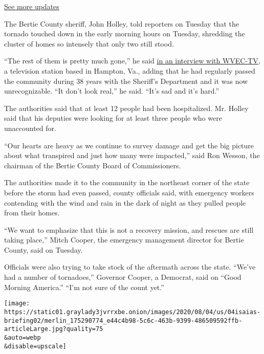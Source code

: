 \href{https://www.nytimes3xbfgragh.onion/2020/08/04/us/isaias-storm-updates.html?action=click\&pgtype=Article\&state=default\&region=MAIN_CONTENT_1\&context=storylines_live_updates}{See
more updates}

The Bertie County sheriff, John Holley, told reporters on Tuesday that
the tornado touched down in the early morning hours on Tuesday,
shredding the cluster of homes so intensely that only two still stood.

``The rest of them is pretty much gone,'' he said
\href{https://www.13newsnow.com/video/news/local/north-carolina/bertie-county-sheriff-john-holley-talks-about-fatality-in-north-carolina/291-99306d30-d640-4e9a-97fa-0221d565f5df}{in
an interview with WVEC-TV}, a television station based in Hampton, Va.,
adding that he had regularly passed the community during 38 years with
the Sheriff's Department and it was now unrecognizable. ``It don't look
real,'' he said. ``It's sad and it's hard.''

The authorities said that at least 12 people had been hospitalized. Mr.
Holley said that his deputies were looking for at least three people who
were unaccounted for.

``Our hearts are heavy as we continue to survey damage and get the big
picture about what transpired and just how many were impacted,'' said
Ron Wesson, the chairman of the Bertie County Board of Commissioners.

The authorities made it to the community in the northeast corner of the
state before the storm had even passed, county officials said, with
emergency workers contending with the wind and rain in the dark of night
as they pulled people from their homes.

``We want to emphasize that this is not a recovery mission, and rescues
are still taking place,'' Mitch Cooper, the emergency management
director for Bertie County, said on Tuesday.

Officials were also trying to take stock of the aftermath across the
state. ``We've had a number of tornadoes,'' Governor Cooper, a Democrat,
said on ``Good Morning America.'' ``I'm not sure of the count yet.''

\texttt{[image: https://static01.graylady3jvrrxbe.onion/images/2020/08/04/us/04isaias-briefing02/merlin\_175290774\_e44c4b98-5c6c-463b-9399-486509592ffb-articleLarge.jpg?quality=75\\\&auto=webp\\\&disable=upscale]}

\hypertarget{-2}{%
\subsection{}\label{-2}}

